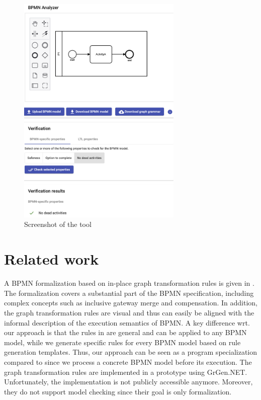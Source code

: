 \documentclass[submission, copyright, creativecommons]{eptcs}
\begin{document}
\begin{figure}[h]
    \centering
    \includegraphics[width=0.7\textwidth]{images/impl.png}
    \caption{Screenshot of the tool}
    \label{fig:implScreenshot}
\end{figure}

\section{Related work} \label{sec:relatedWork}
A BPMN formalization based on in-place graph transformation rules is given in \cite{vangorpVisualTokenbasedFormalization2013}.
The formalization covers a substantial part of the BPMN specification, including complex concepts such as inclusive gateway merge and compensation.
In addition, the graph transformation rules are visual and thus can easily be aligned with the informal description of the execution semantics of BPMN.
A key difference wrt. our approach is that the rules in \cite{vangorpVisualTokenbasedFormalization2013} are general and can be applied to any BPMN model, while we generate specific rules for every BPMN model based on rule generation templates.
Thus, our approach can be seen as a program specialization compared to \cite{vangorpVisualTokenbasedFormalization2013} since we process a concrete BPMN model before its execution.
The graph transformation rules are implemented in a prototype using GrGen.NET.
Unfortunately, the implementation is not publicly accessible anymore.
Moreover, they do not support model checking since their goal is only formalization.
\end{document}
